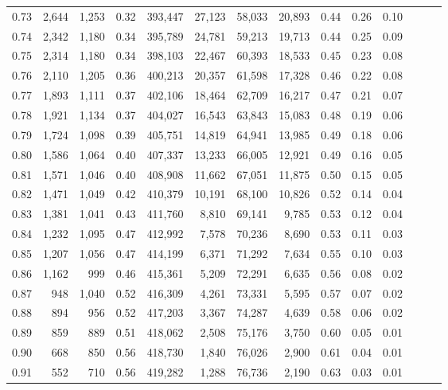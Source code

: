 \begin{tabular}{rrrrrrrrrrrrrr}
0.73 &  2,644 &  1,253 &  0.32 &  393,447 &   27,123 &  58,033 &  20,893 &  0.44 &  0.26 &      0.10 \\
0.74 &  2,342 &  1,180 &  0.34 &  395,789 &   24,781 &  59,213 &  19,713 &  0.44 &  0.25 &      0.09 \\
0.75 &  2,314 &  1,180 &  0.34 &  398,103 &   22,467 &  60,393 &  18,533 &  0.45 &  0.23 &      0.08 \\
0.76 &  2,110 &  1,205 &  0.36 &  400,213 &   20,357 &  61,598 &  17,328 &  0.46 &  0.22 &      0.08 \\
0.77 &  1,893 &  1,111 &  0.37 &  402,106 &   18,464 &  62,709 &  16,217 &  0.47 &  0.21 &      0.07 \\
0.78 &  1,921 &  1,134 &  0.37 &  404,027 &   16,543 &  63,843 &  15,083 &  0.48 &  0.19 &      0.06 \\
0.79 &  1,724 &  1,098 &  0.39 &  405,751 &   14,819 &  64,941 &  13,985 &  0.49 &  0.18 &      0.06 \\
0.80 &  1,586 &  1,064 &  0.40 &  407,337 &   13,233 &  66,005 &  12,921 &  0.49 &  0.16 &      0.05 \\
0.81 &  1,571 &  1,046 &  0.40 &  408,908 &   11,662 &  67,051 &  11,875 &  0.50 &  0.15 &      0.05 \\
0.82 &  1,471 &  1,049 &  0.42 &  410,379 &   10,191 &  68,100 &  10,826 &  0.52 &  0.14 &      0.04 \\
0.83 &  1,381 &  1,041 &  0.43 &  411,760 &    8,810 &  69,141 &   9,785 &  0.53 &  0.12 &      0.04 \\
0.84 &  1,232 &  1,095 &  0.47 &  412,992 &    7,578 &  70,236 &   8,690 &  0.53 &  0.11 &      0.03 \\
0.85 &  1,207 &  1,056 &  0.47 &  414,199 &    6,371 &  71,292 &   7,634 &  0.55 &  0.10 &      0.03 \\
0.86 &  1,162 &    999 &  0.46 &  415,361 &    5,209 &  72,291 &   6,635 &  0.56 &  0.08 &      0.02 \\
0.87 &    948 &  1,040 &  0.52 &  416,309 &    4,261 &  73,331 &   5,595 &  0.57 &  0.07 &      0.02 \\
0.88 &    894 &    956 &  0.52 &  417,203 &    3,367 &  74,287 &   4,639 &  0.58 &  0.06 &      0.02 \\
0.89 &    859 &    889 &  0.51 &  418,062 &    2,508 &  75,176 &   3,750 &  0.60 &  0.05 &      0.01 \\
0.90 &    668 &    850 &  0.56 &  418,730 &    1,840 &  76,026 &   2,900 &  0.61 &  0.04 &      0.01 \\
0.91 &    552 &    710 &  0.56 &  419,282 &    1,288 &  76,736 &   2,190 &  0.63 &  0.03 &      0.01 \\

\end{tabular}
